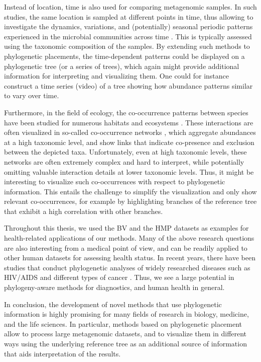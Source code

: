Instead of location, time is also used for comparing metagenomic samples.
In such studies, the same location is sampled at different points in time,
thus allowing to investigate the dynamics, variations, and (potentially) seasonal periodic patterns
experienced in the microbial communities across time \cite{Costello2009,Faust2015}.
This is typically assessed using the taxonomic composition of the samples.
By extending such methods to phylogenetic placements,
the time-dependent patterns could be displayed on a phylogenetic tree (or a series of trees),
which again might provide additional information for interpreting and visualizing them.
One could for instance construct a time series (video) of a tree showing
how abundance patterns similar to  vary over time.

Furthermore, in the field of ecology, the co-occurrence patterns between species
have been studied for numerous habitats and ecosystems \cite{Lima-Mendez2015,Villalobos2017,Zelezniak2015}.
These interactions are often visualized in so-called co-occurrence networks \cite{Chaffron2010,Faust2012},
which aggregate abundances at a high taxonomic level,
and show links that indicate co-presence and exclusion between the depicted taxa.
Unfortunately, even at high taxonomic levels, these networks are often extremely complex and hard to interpret,
while potentially omitting valuable interaction details at lower taxonomic levels.
Thus, it might be interesting to visualize such co-occurrences with respect to phylogenetic information.
This entails the challenge to simplify the visualization and only show relevant co-occurrences,
for example by highlighting branches of the reference tree that exhibit a high correlation with other branches.

Throughout this thesis, we used the \acf{BV} \cite{Srinivasan2012} and the \acf{HMP} \cite{Huttenhower2012,Methe2012}
datasets as examples for health-related applications of our methods.
Many of the above research questions are also interesting from a medical point of view,
and can be readily applied to other human datasets for assessing health status.
In recent years, there have been studies that conduct phylogenetic analyses of widely researched diseases
such as HIV/AIDS \cite{Castro-Nallar2012,Brenner2013,Ratmann2017} and different types of cancer \cite{Brown2017a,Abbosh2017}.
Thus, we see a large potential in phylogeny-aware methods for diagnostics, and human health in general.

In conclusion, the development of novel methods that use phylogenetic information
is highly promising for many fields of research in biology, medicine, and the life sciences.
In particular, methods based on phylogenetic placement allow to process large metagenomic datasets,
and to visualize them in different ways using the underlying reference tree as an additional source
of information that aids interpretation of the results.
